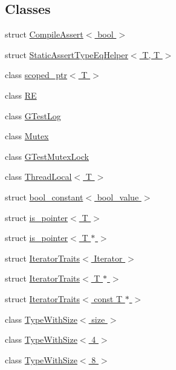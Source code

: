 \subsection*{\-Classes}
\begin{DoxyCompactItemize}
\item 
struct \hyperlink{structtesting_1_1internal_1_1CompileAssert}{\-Compile\-Assert$<$ bool $>$}
\item 
struct \hyperlink{structtesting_1_1internal_1_1StaticAssertTypeEqHelper_3_01T_00_01T_01_4}{\-Static\-Assert\-Type\-Eq\-Helper$<$ T, T $>$}
\item 
class \hyperlink{classtesting_1_1internal_1_1scoped__ptr}{scoped\-\_\-ptr$<$ T $>$}
\item 
class \hyperlink{classtesting_1_1internal_1_1RE}{\-R\-E}
\item 
class \hyperlink{classtesting_1_1internal_1_1GTestLog}{\-G\-Test\-Log}
\item 
class \hyperlink{classtesting_1_1internal_1_1Mutex}{\-Mutex}
\item 
class \hyperlink{classtesting_1_1internal_1_1GTestMutexLock}{\-G\-Test\-Mutex\-Lock}
\item 
class \hyperlink{classtesting_1_1internal_1_1ThreadLocal}{\-Thread\-Local$<$ T $>$}
\item 
struct \hyperlink{structtesting_1_1internal_1_1bool__constant}{bool\-\_\-constant$<$ bool\-\_\-value $>$}
\item 
struct \hyperlink{structtesting_1_1internal_1_1is__pointer}{is\-\_\-pointer$<$ T $>$}
\item 
struct \hyperlink{structtesting_1_1internal_1_1is__pointer_3_01T_01_5_01_4}{is\-\_\-pointer$<$ T $\ast$ $>$}
\item 
struct \hyperlink{structtesting_1_1internal_1_1IteratorTraits}{\-Iterator\-Traits$<$ Iterator $>$}
\item 
struct \hyperlink{structtesting_1_1internal_1_1IteratorTraits_3_01T_01_5_01_4}{\-Iterator\-Traits$<$ T $\ast$ $>$}
\item 
struct \hyperlink{structtesting_1_1internal_1_1IteratorTraits_3_01const_01T_01_5_01_4}{\-Iterator\-Traits$<$ const T $\ast$ $>$}
\item 
class \hyperlink{classtesting_1_1internal_1_1TypeWithSize}{\-Type\-With\-Size$<$ size $>$}
\item 
class \hyperlink{classtesting_1_1internal_1_1TypeWithSize_3_014_01_4}{\-Type\-With\-Size$<$ 4 $>$}
\item 
class \hyperlink{classtesting_1_1internal_1_1TypeWithSize_3_018_01_4}{\-Type\-With\-Size$<$ 8 $>$}
\end{DoxyCompactItemize}
